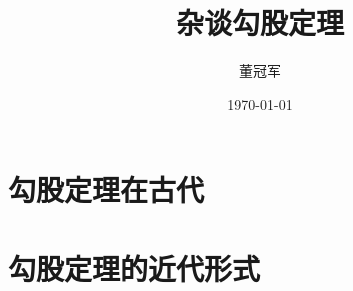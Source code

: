 \documentclass[UTF8]{ctexart}
\title {杂谈勾股定理}
\author{董冠军}
\date{\today}
\begin{document}
\maketitle
\tableofcontents

\section{勾股定理在古代}
\section{勾股定理的近代形式}


\end{document}

